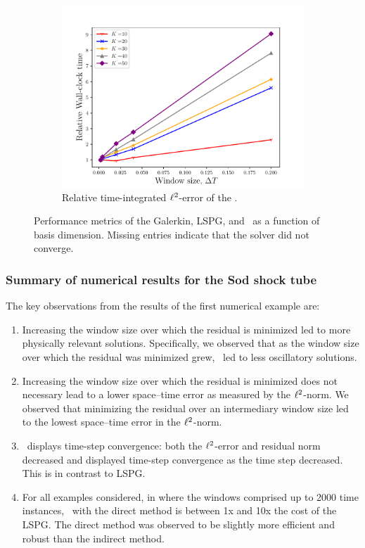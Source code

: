 \begin{figure}
\begin{center}
\begin{subfigure}[t]{0.45\textwidth}
\includegraphics[width=1.\linewidth]{figs/sod/converge_walltimes.pdf}
\caption{Relative time-integrated $\ell^2$-error of the \methodAcronymROM.}
\label{fig:sod_error_converge}
\end{subfigure}
\caption{Performance metrics of the Galerkin, LSPG, and \methodAcronymROMs\ as a function of basis dimension. Missing entries indicate that the solver did not converge.} 
\label{fig:convergence_study}
\end{center}
\end{figure}


\subsubsection{Summary of numerical results for the Sod shock tube}
The key observations from the results of the first numerical example are: 
\begin{enumerate}
\item Increasing the window size over which the residual is minimized led to more physically relevant solutions. Specifically, we observed that as the window size over which the residual was minimized grew, \methodAcronym\ led to less oscillatory solutions.
\item Increasing the window size over which the residual is minimized does not necessary lead to a lower space--time error as measured by the $\ell^2$-norm. We observed that minimizing the residual over an intermediary window size led to the lowest space--time error in the $\ell^2$-norm. 
\item \methodAcronym\ displays time-step convergence: both the $\ell^2$-error and residual norm decreased and displayed time-step convergence as the time step decreased. This is in contrast to LSPG.
\item For all examples considered, in where the windows comprised up to 2000 time instances, \methodAcronym\ with the direct method is between 1x and 10x the cost of the LSPG. The 
direct method was observed to be slightly more efficient and robust than the indirect method.
\end{enumerate} 


